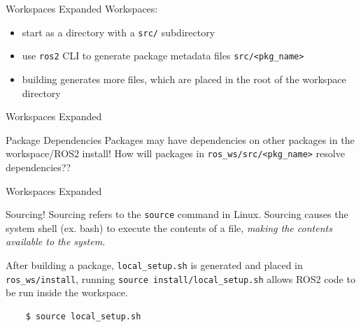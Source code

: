 \documentclass{beamer}
\begin{document}
\begin{frame}[fragile]{Workspaces Expanded}
    \Large Workspaces: \\
    \begin{itemize}
        \item start as a directory with a \verb|src/| subdirectory
        \item use \verb|ros2| CLI to generate package metadata files \verb|src/<pkg_name>|
        \item building generates more files, which are placed in the root of the workspace directory
    \end{itemize}
\end{frame}

\begin{frame}[fragile]{Workspaces Expanded}
    \begin{alertblock}{Package Dependencies}
        Packages may have dependencies on other packages in the workspace/ROS2 install! How will packages in \verb|ros_ws/src/<pkg_name>| resolve dependencies??
    \end{alertblock}

\end{frame}

\begin{frame}[fragile]{Workspaces Expanded}
        \begin{block}{Sourcing!}
            Sourcing refers to the \verb|source| command in Linux. Sourcing causes the system shell (ex. bash) to execute the contents of a file, \textit{making the contents available to the system.}\\

        \end{block}

        \begin{example}
            After building a package, \verb|local_setup.sh| is generated and placed in \verb|ros_ws/install|, running \verb|source install/local_setup.sh| allows ROS2 code to be run inside the workspace.
            \begin{verbatim}
    $ source local_setup.sh
            \end{verbatim}
        \end{example}
\end{frame}
\end{document}
